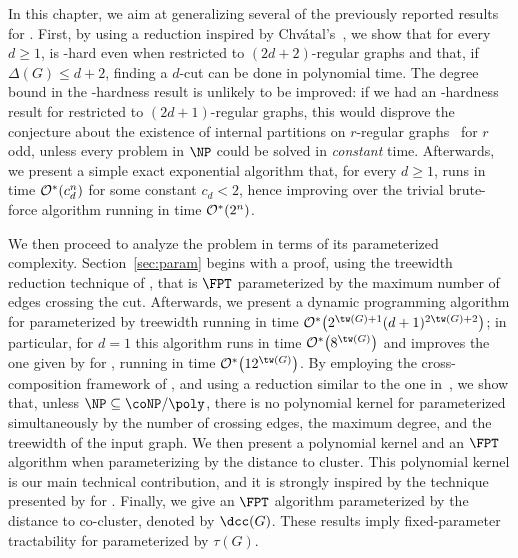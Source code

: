 
In this chapter, we aim at generalizing several of the previously reported results for .
First, by using a reduction inspired by Chvátal's~\citep{chvatal_matching_cut}, we show that for every $d \geq 1$,  is \NP-hard even when restricted to $(2d+2)$-regular graphs and that, if $\Delta(G) \leq d+2$, finding a $d$-cut can be done in polynomial time. The degree bound in the \NP-hardness result is unlikely to be improved: if we had an \NP-hardness result for  restricted to $(2d+1)$-regular graphs, this would disprove the conjecture about the existence of internal partitions on $r$-regular graphs~\citep{DeVos09,internal_partition_regular6,internal_partition_regular3_4} for $r$ odd, unless every problem in $\NP$ could be solved in \textit{constant} time.
Afterwards, we present a simple exact exponential algorithm that, for every $d \geq 1$, runs in time $\mathcal{O}^*\!\left(c_d^n\right)$ for some constant $c_d < 2$, hence improving over the trivial brute-force algorithm running in time $\mathcal{O}^*\!\left(2^n\right)$.

We then proceed to analyze the problem in terms of its parameterized complexity.
Section~\ref{sec:param} begins with a proof, using the treewidth reduction technique of \citep{marx_treewidth_reduction}, that  is $\FPT$ parameterized by the maximum number of edges crossing the cut.
Afterwards, we present a dynamic programming algorithm for  parameterized by treewidth running in time $\bigOs{2^{\tw(G)+1}(d+1)^{2\tw(G) + 2}}$; in particular, for $d=1$ this algorithm runs in time $\bigOs{8^{\tw(G)}}$ and improves the one given by \cite{matching_cut_structural} for , running in time  $\bigOs{12^{\tw(G)}}$.
By employing the cross-composition framework of \cite{cross_composition}, and using a reduction similar to the one in~\citep{matching_cut_ipec}, we show that, unless $\NP \subseteq \coNP/\poly$, there is no polynomial kernel for  parameterized simultaneously by the number of crossing edges, the maximum degree, and the treewidth of the input graph.
We then present a polynomial kernel and an $\FPT$ algorithm when parameterizing by the distance to cluster.
This polynomial kernel is our main technical contribution, and it is strongly inspired by the technique presented by \cite{matching_cut_ipec} for . Finally, we give an $\FPT$ algorithm parameterized by the distance to co-cluster, denoted by $\dcc(G)$.
These results imply fixed-parameter tractability for  parameterized by $\tau(G)$. 

